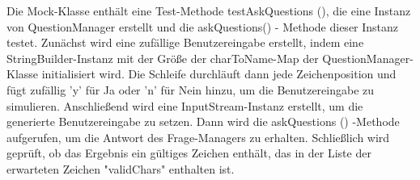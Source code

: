 Die Mock-Klasse enthält eine Test-Methode testAskQuestions (), die eine Instanz von QuestionManager erstellt und die askQuestions() - Methode dieser Instanz testet. Zunächst wird eine zufällige Benutzereingabe erstellt, indem eine StringBuilder-Instanz mit der Größe der charToName-Map der QuestionManager-Klasse initialisiert wird. Die Schleife durchläuft dann jede Zeichenposition und fügt zufällig 'y' für Ja oder 'n' für Nein hinzu, um die Benutzereingabe zu simulieren. Anschließend wird eine InputStream-Instanz erstellt, um die generierte Benutzereingabe zu setzen. Dann wird die askQuestions () -Methode aufgerufen, um die Antwort des Frage-Managers zu erhalten. Schließlich wird geprüft, ob das Ergebnis ein gültiges Zeichen enthält, das in der Liste der erwarteten Zeichen "validChars" enthalten ist.